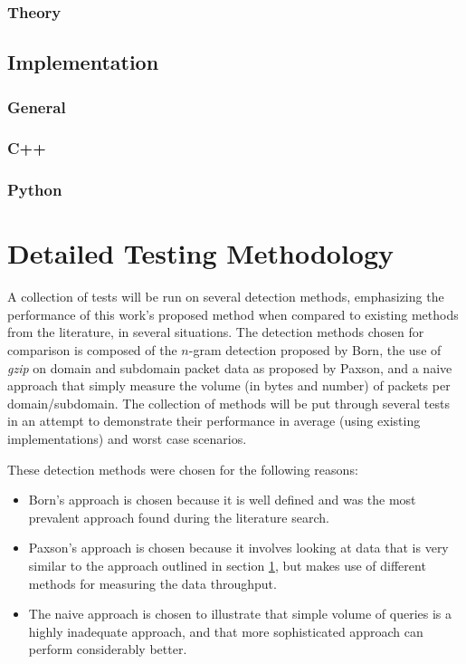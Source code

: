 \documentclass[12pt]{report}
\theoremstyle{remark}
\theoremstyle{definition}
\theoremstyle{definition}
\theoremstyle{definition}
\begin{document}
\subsection{Theory}

\section{Implementation}
\label{implementation}
\subsection{General}
\subsection{C++}
\subsection{Python}
\label{proposed-method-python}

\chapter{Detailed Testing Methodology}
A collection of tests will be run on
several detection methods, emphasizing the performance of this work's proposed
method when compared to existing methods from the literature, in several
situations. The detection methods chosen for comparison is composed of the
$n$-gram detection proposed by Born\cite{Born2010.cfa}, the use of \emph{gzip}
on domain and subdomain packet data as proposed by Paxson\cite{Paxson2011}, and
a naive approach that simply measure the volume (in bytes and number) of packets
per domain/subdomain. The collection of methods will be put through several
tests in an attempt to demonstrate their performance in average (using existing
implementations) and worst case scenarios.

These detection methods were chosen for the following reasons:

\begin{itemize}
\item Born's approach is chosen because it is well defined and
was the most prevalent approach found during the literature search.

\item Paxson's approach is chosen because it involves looking at data that is very
similar to the approach outlined in section \ref{implementation}, but makes use
of different methods for measuring the data throughput.

\item The naive approach
is chosen to illustrate that simple volume of queries is a highly inadequate
approach, and that more sophisticated approach can perform considerably better.
\end{itemize}
\end{document}

